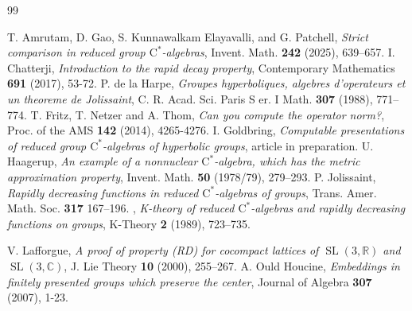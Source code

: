 \documentclass[10pt,a4paper]{amsart}
\newcommand{\cstar}{$\mathrm{C}^*$}
\theoremstyle{plain}
\theoremstyle{definition}
\numberwithin{equation}{section}
\begin{document}
\begin{thebibliography}{99}

 T. Amrutam, D. Gao, S. Kunnawalkam Elayavalli, and G. Patchell, \emph{Strict comparison in reduced group \cstar-algebras}, Invent. Math. \textbf{242} (2025), 639–657.
 I. Chatterji, \emph{Introduction to the rapid decay property}, Contemporary Mathematics \textbf{691} (2017), 53-72.
 P. de la Harpe, \emph{Groupes hyperboliques, algebres d’operateurs et un theoreme de Jolissaint}, C. R. Acad. Sci. Paris S er. I Math. \textbf{307} (1988), 771–774.
  T. Fritz, T. Netzer and A. Thom,  \emph{Can you compute the operator norm?}, Proc. of the AMS \textbf{142} (2014), 4265-4276.
  I. Goldbring, \emph{Computable presentations of reduced group \cstar-algebras of hyperbolic groups}, article in preparation.
  U. Haagerup, \emph{An example of a nonnuclear \cstar-algebra, which has the metric approximation property}, Invent. Math. \textbf{50} (1978/79), 279–293.
  P. Jolissaint, \emph{Rapidly decreasing functions in reduced \cstar-algebras of groups}, Trans. Amer. Math. Soc. \textbf{317} 167–196.
 \bysame, \emph{K-theory of reduced \cstar-algebras and rapidly decreasing functions on groups}, K-Theory \textbf{2} (1989), 723–735.

 V. Lafforgue, \emph{A proof of property (RD) for cocompact lattices of $\operatorname{SL}(3, \mathbb{R})$ and $\operatorname{SL}(3, \mathbb{C})$}, J. Lie Theory \textbf{10} (2000), 255–267.
 A. Ould Houcine, \emph{Embeddings in finitely presented groups which preserve the center}, Journal of Algebra \textbf{307} (2007), 1-23.
\end{thebibliography}
\end{document}
